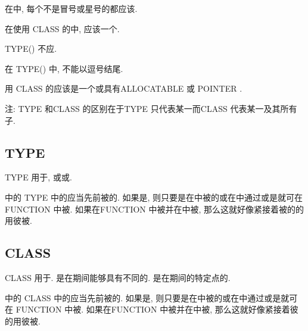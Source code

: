 在\tit{\Declaration{}\TypeSpecifier{}}中, 每个不是冒号或星号的\tit{\TypeParameter{}\Value{}}都应该\Specification{}\Expression{}.

在使用 CLASS \Keyword{}的\tit{\Declaration{}\TypeSpecifier{}}中, \tit{\Derived{}\TypeSpecifier{}}应该\Specify{}一个\ExtensibleType{}.

TYPE(\tit{\Derived{}\TypeSpecifier{}}) 不应\Specify{}\AbstractType{}.

在 TYPE(\tit{\Intrinsic{}\TypeSpecifier{}}) 中, \tit{\Intrinsic{}\TypeSpecifier{}}不能以逗号结尾.

用 CLASS \Keyword{}\Declare{}的\Entity{}应该是一个\DummyArgument{}或具有ALLOCATABLE 或 POINTER \Attribute{}.

注: TYPE \TypeSpecifier{}和CLASS \TypeSpecifier{}的区别在于TYPE \TypeSpecifier{}只代表某一\Type{}而CLASS \TypeSpecifier{}代表某一\Type{}及其所有子\Type{}.

\subsection{TYPE \TypeSpecifier{}}

TYPE \TypeSpecifier{}用于\Declare{}\AssumedType{}\Entity{}, 或\IntrinsicType{}或\DerivedType{}\Entity{}.

\Type{}\Declaration{}\Statement{}中的 TYPE \TypeSpecifier{}中的\tit{\Derived{}\TypeSpecifier{}}应当\Specify{}先前被\Define{}的\DerivedType{}. 如果\Data{}\Entity{}是\Function{}\Result{}, 则只要\DerivedType{}是在\FunctionBody{}中被\Define{}的或在\FunctionBody{}中通过\UseAssociation{}或\HostAssociation{}是\Accessible{}\DerivedType{}就可在 FUNCTION \Statement{} 中被\Specify{}. 如果\DerivedType{}在FUNCTION \Statement{}中被\Specify{}并在\FunctionBody{}中被\Define{}, 那么这就好像\Function{}\Result{}紧接着被\Specify{}的\DerivedType{}的\tit{\DerivedType{}\Definition{}}用彼\DerivedType{}被\Declare{}.

\subsection{CLASS \TypeSpecifier{}}

CLASS \TypeSpecifier{}用于\Declare{}\Polymorphic{}\Entity{}. \Polymorphic{}\Entity{}是在\Program{}\Execution{}期间能够具有不同\DynamicType{}的\Data{}\Entity{}. \DynamicType{}是\Data{}\Entity{}在\Program{}\Execution{}期间的特定点的\Type{}.

\Type{}\Declaration{}\Statement{}中的 CLASS \TypeSpecifier{}中的\tit{\Derived{}\TypeSpecifier{}}应当\Specify{}先前被\Define{}的\DerivedType{}. 如果\Data{}\Entity{}是\Function{}\Result{}, 则只要\DerivedType{}是在\FunctionBody{}中被\Define{}的或在\FunctionBody{}中通过\UseAssociation{}或\HostAssociation{}是\Accessible{}\DerivedType{}就可在 FUNCTION \Statement{} 中被\Specify{}. 如果\DerivedType{}在FUNCTION \Statement{}中被\Specify{}并在\FunctionBody{}中被\Define{}, 那么这就好像\Function{}\Result{}紧接着彼\DerivedType{}的\tit{\DerivedType{}\Definition{}}用彼\DerivedType{}被\Declare{}.

